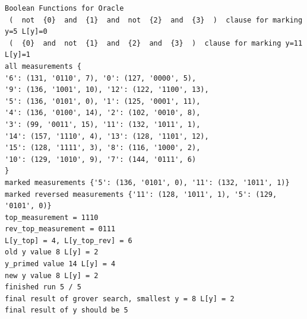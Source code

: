 \documentclass[11pt]{article}
\begin{document}
\begin{verbatim}
Boolean Functions for Oracle
 (  not  {0}  and  {1}  and  not  {2}  and  {3}  )  clause for marking y=5 L[y]=0
 (  {0}  and  not  {1}  and  {2}  and  {3}  )  clause for marking y=11 L[y]=1
all measurements {
'6': (131, '0110', 7), '0': (127, '0000', 5), 
'9': (136, '1001', 10), '12': (122, '1100', 13), 
'5': (136, '0101', 0), '1': (125, '0001', 11), 
'4': (136, '0100', 14), '2': (102, '0010', 8), 
'3': (99, '0011', 15), '11': (132, '1011', 1), 
'14': (157, '1110', 4), '13': (128, '1101', 12), 
'15': (128, '1111', 3), '8': (116, '1000', 2), 
'10': (129, '1010', 9), '7': (144, '0111', 6)
}
marked measurements {'5': (136, '0101', 0), '11': (132, '1011', 1)}
marked reversed measurements {'11': (128, '1011', 1), '5': (129, '0101', 0)}
top_measurement = 1110
rev_top_measurement = 0111
L[y_top] = 4, L[y_top_rev] = 6
old y value 8 L[y] = 2
y_primed value 14 L[y] = 4
new y value 8 L[y] = 2
finished run 5 / 5
final result of grover search, smallest y = 8 L[y] = 2
final result of y should be 5
\end{verbatim}
\end{document}
